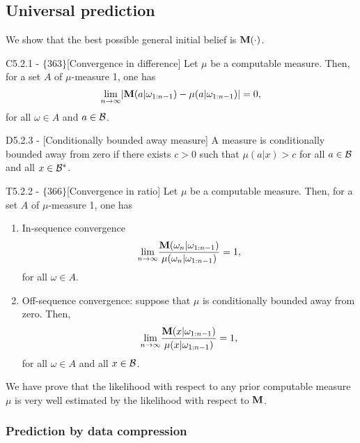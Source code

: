 \documentclass{article}
\begin{document}
\subsection{Universal prediction}

We show that the best possible general initial belief is ${\bf M}(\cdot)$.
\begin{flexitheorem}{C5.2.1 - $\{363\}$}[Convergence in difference]
    Let $\mu$ be a computable measure. Then, for a set $A$ of $\mu$-measure 1, one has
    \begin{equation}
        \underset{n \to \infty}{\lim} |{\bf M}(a|\omega_{1:n-1}) - \mu(a|\omega_{1:n-1})| = 0,
    \end{equation}
    for all $\omega \in A$ and $a \in \mathcal{B}$.
\end{flexitheorem}


\begin{flexidefinition}{D5.2.3 - }[Conditionally bounded away measure]
    A measure is conditionally bounded away from zero if there exists $c > 0$ such that $\mu(a|x) > c$ for all $a \in \mathcal{B}$ and all $x \in \mathcal{B}^\ast$.
\end{flexidefinition}
\begin{flexitheorem}{T5.2.2 - $\{366\}$}[Convergence in ratio]
    Let $\mu$ be a computable measure. Then, for a set $A$ of $\mu$-measure 1, one has
    \begin{enumerate}[label = (\alph*)]
        \item In-sequence convergence
    \begin{equation}
        \underset{n \to \infty}{\lim} \frac{{\bf M}(\omega_n|\omega_{1:n-1})}{\mu(\omega_n|\omega_{1:n-1})} = 1,
    \end{equation}
    for all $\omega \in A$.
    \item Off-sequence convergence: suppose that $\mu$ is conditionally bounded away from zero. Then,
    \begin{equation}
        \underset{n \to \infty}{\lim} \frac{{\bf M}(x|\omega_{1:n-1})}{\mu(x|\omega_{1:n-1})} = 1,
    \end{equation}
    for all $\omega \in A$ and all $x \in \mathcal{B}$.
\end{enumerate}
\end{flexitheorem}

We have prove that the likelihood with respect to any prior computable measure $\mu$ is very well estimated by the likelihood with respect to ${\bf M}$.

\subsubsection{Prediction by data compression}
\end{document}
